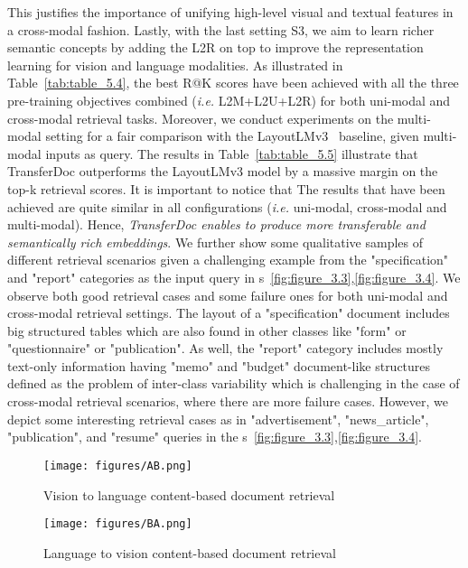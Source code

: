 \documentclass[preprint,review,12pt]{elsarticle}
\newcommand{\ie}{\textit{i.e. }}
\begin{document}
This justifies the importance of unifying high-level visual and textual features in a cross-modal fashion. Lastly, with the last setting S3, we aim to learn richer semantic concepts by adding the L2R on top to improve the representation learning for vision and language modalities. As illustrated in Table~\ref{tab:table_5.4}, the best R@K scores have been achieved with all the three pre-training objectives combined (\ie L2M+L2U+L2R) for both uni-modal and cross-modal retrieval tasks. Moreover, we conduct experiments on the multi-modal setting for a fair comparison with the LayoutLMv3~\cite{huang2022layoutlmv3} baseline, given multi-modal inputs as query. The results in Table~\ref{tab:table_5.5} illustrate that TransferDoc outperforms the LayoutLMv3 model by a massive margin on the top-k retrieval scores. It is important to notice that The results that have been achieved are quite similar in all configurations (\ie uni-modal, cross-modal and multi-modal). Hence, \textit{TransferDoc enables to produce more transferable and semantically rich embeddings}.
We further show some qualitative samples of different retrieval scenarios given a challenging example from the "specification" and "report" categories as the input query in \figurename s~\ref{fig:figure_3.3},\ref{fig:figure_3.4}. We observe both good retrieval cases and some failure ones for both uni-modal and cross-modal retrieval settings. The layout of a "specification" document includes big structured tables which are also found in other classes like "form" or "questionnaire" or "publication". As well, the "report" category includes mostly text-only information having "memo" and "budget" document-like structures defined as the problem of inter-class variability which is challenging in the case of cross-modal retrieval scenarios, where there are more failure cases. However, we depict some interesting retrieval cases as in "advertisement", "news\_article", "publication", and "resume" queries in the \figurename s~\ref{fig:figure_3.3},\ref{fig:figure_3.4}.
\begin{figure*}[t!]
\centering
\begin{subfigure}{\textwidth}
  {
  \texttt{[image: figures/AB.png]}}\quad
  \caption{Vision to language content-based document retrieval}
  \label{fig:vision_to_language_retrieval}
 \vspace*{8pt}
\end{subfigure}
\hfill
\begin{subfigure}{\textwidth}
  {
  \texttt{[image: figures/BA.png]}}\quad
  \caption{Language to vision content-based document retrieval}
  \label{fig:language_to_vision_retrieval}
\end{subfigure}
\caption{\textbf{Representative cross-modal retrieval samples of the pre-trained TransferDoc model.} Zoom in for better visualization. The first column represents the input example query randomly selected from the test set of RVL-CDIP, and the top-5 retrievals are shown in following columns in order. Red and green borders are used to depict the incorrect and correct classes of retrieved documents respectively. For each task setting (\ie Vision  Language and Language  Vision, the same input example query is used.}
\label{fig:figure_3.4}
\end{figure*}
\end{document}
